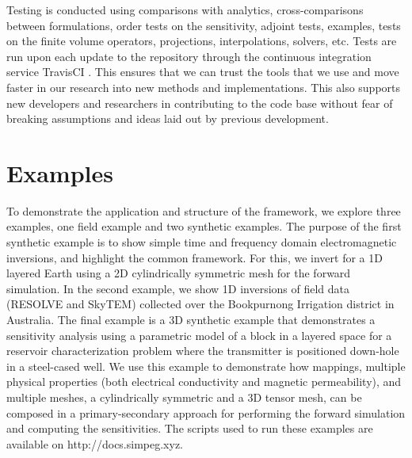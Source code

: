 Testing is conducted using comparisons with analytics,
cross-comparisons between formulations,
order tests on the sensitivity, adjoint tests, examples, tests on the finite volume operators,
projections, interpolations, solvers, etc. Tests are run upon each
update to the repository through the continuous integration service TravisCI
\citep{Travis}. This ensures that we can trust the tools that we use and move
faster in our research into new methods and implementations. This also
supports new developers and researchers in contributing to the code base without
fear of breaking assumptions and ideas laid out by previous development.



\section{Examples}
\label{sec:Examples}



To demonstrate the application and structure of the framework, we explore three examples, one field example and two synthetic examples.
The purpose of the first synthetic example is to show simple time
and frequency domain electromagnetic inversions, and highlight the common
framework. For this, we invert for a 1D layered Earth using a 2D cylindrically
symmetric mesh for the forward simulation. In the second example, we show 1D inversions of field data (RESOLVE and SkyTEM)
collected over the Bookpurnong Irrigation district in Australia.
The final example is a 3D synthetic example that demonstrates a
sensitivity analysis using a parametric model of a block in a layered space
for a reservoir characterization problem where the transmitter is positioned
down-hole in a steel-cased well. We use this example to demonstrate how
mappings, multiple physical properties (both electrical conductivity and
magnetic permeability), and multiple meshes, a cylindrically symmetric and a
3D tensor mesh, can be composed in a primary-secondary approach for performing
the forward simulation and computing the sensitivities. The scripts used to
run these examples are available on http://docs.simpeg.xyz.




